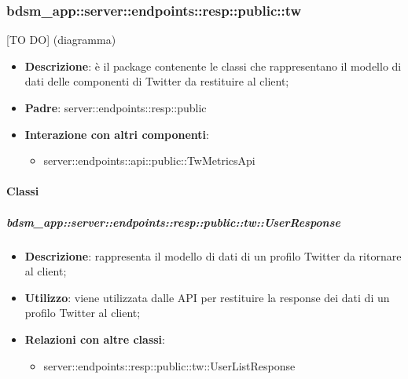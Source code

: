 \subsubsection{bdsm\_app::server::endpoints::resp::public::tw} %
\label{ssub:bdsm_app_server_endpoints_resp_public_tw}
[TO DO] (diagramma) \newline \newline

\begin{itemize}
  \item \textbf{Descrizione}: è il package contenente le classi che rappresentano il modello di dati delle componenti di Twitter da restituire al client;
  \item \textbf{Padre}: server::endpoints::resp::public
  \item \textbf{Interazione con altri componenti}:
  	\begin{itemize}
  		\item server::endpoints::api::public::TwMetricsApi
  	\end{itemize}
\end{itemize}

	\paragraph{Classi} %

    \subparagraph{bdsm\_app::server::endpoints::resp::public::tw::UserResponse} %
    \label{subp:bdsm_app_server_endpoints_resp_public_tw_userresponse}
    \begin{itemize}
      \item \textbf{Descrizione}: rappresenta il modello di dati di un profilo Twitter da ritornare al client;
      \item \textbf{Utilizzo}: viene utilizzata dalle API per restituire la response dei dati di un profilo Twitter al client;
      \item \textbf{Relazioni con altre classi}:
        \begin{itemize}
          \item server::endpoints::resp::public::tw::UserListResponse
        \end{itemize}
      \end{itemize}
    
